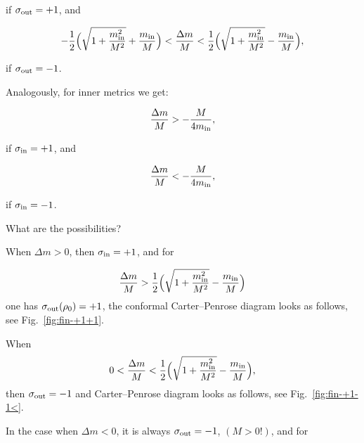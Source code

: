 if $\sigma_{\rm out} = + 1$, and

\begin{equation}

\label{sig-1}

- \frac{1}{2} \Bigl( \sqrt{1 + \frac{m_{\rm in}^2}{M^2}} + \frac{m_{\rm in}}{M} \Bigr) < 

\frac{\Delta m}{M} < \frac{1}{2} \Bigl( \sqrt{1 + \frac{m_{\rm in}^2}{M^2}} - \frac{m_{\rm in}}{M} \Bigr),

\end{equation}

if $\sigma_{\rm out} = - 1$. 

Analogously, for inner metrics we get:

\begin{equation}

\label{sin1}

\frac{\Delta m}{M} > - \frac{M}{4 m_{\rm in}} ,

\end{equation}

if $\sigma_{\rm in} = + 1$, and

\begin{equation}

\label{sin-1}

\frac{\Delta m}{M} < - \frac{M}{4 m_{\rm in}} ,

\end{equation}

if $\sigma_{\rm in} = - 1$. 

What are the possibilities? 

When $\Delta m > 0$, then $\sigma_{\rm in} = + 1$, and for

$$\frac{\Delta m}{M} > \frac{1}{2} \Bigl( \sqrt{1 + \frac{m_{\rm in}^2}{M^2}} - \frac{m_{\rm in}}{M} \Bigr)$$ one has $\sigma_{\rm out}(\rho_0) = + 1$, the conformal Carter--Penrose diagram looks as follows, see Fig.~\ref{fig:fin-+1+1}.



When  $$0 <\frac{\Delta m}{M} < \frac{1}{2} \Bigl( \sqrt{1 + \frac{m_{\rm in}^2}{M^2}} - \frac{m_{\rm in}}{M} \Bigr),$$ then $\sigma_{\rm out} = -1$ and Carter--Penrose diagram looks as follows, see Fig.~\ref{fig:fin-+1-1<}.



 





In the case when $\Delta m < 0$, it is always $\sigma_{\rm out} = - 1$, $(M > 0 !)$, and for 

